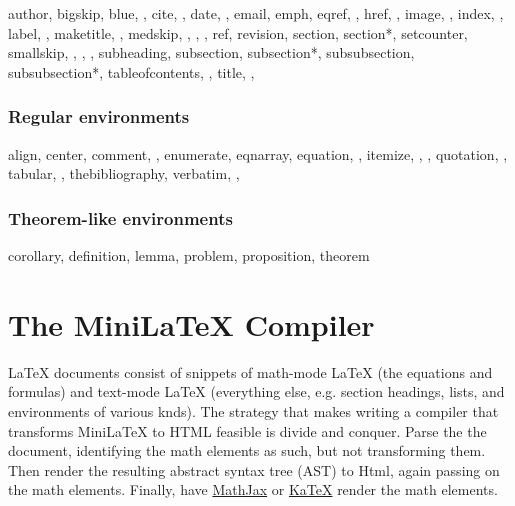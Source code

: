 \begin{indent}
author,
bigskip,
blue,
,
cite,
,
date,
,
email,
emph,
eqref,
,
href,
,
image,
,
index,
,
label,
,
maketitle,
,
medskip,
,
,
,
ref,
revision,
section,
section*,
setcounter,
smallskip,
,
,
,
subheading,
subsection,
subsection*,
subsubsection,
subsubsection*,
tableofcontents,
,
title,
,
\end{indent}

\subsubsection{Regular environments}

\begin{indent}
align,
center,
comment,
,
enumerate,
eqnarray,
equation,
,
itemize,
,
,
quotation,
,
tabular,
,
thebibliography,
verbatim,
,
\end{indent}

\subsubsection{Theorem-like environments}

\begin{indent}
corollary,
definition,
lemma,
problem,
proposition,
theorem
\end{indent}


\section{The MiniLaTeX Compiler}


LaTeX documents consist of snippets of math-mode LaTeX (the equations and formulas) and text-mode LaTeX (everything else, e.g. section headings, lists, and environments of various knds).  The strategy that makes writing a compiler that transforms MiniLaTeX to HTML feasible is divide and conquer.  Parse the the document, identifying the math elements as such, but not transforming them.  Then render the resulting abstract syntax tree (AST) to Html, again passing on the math elements.  Finally, have \href{https://mathjax.org}{MathJax} or \href{https://katex.org}{KaTeX} render the math elements.

